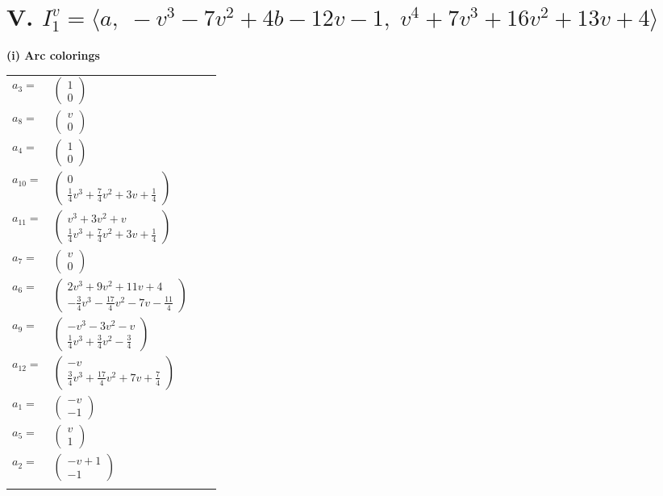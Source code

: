 \documentclass[1p]{elsarticle_modified}
\theoremstyle{definition}
\begin{document}
\centering \section*{V. $I^v_{1}= \langle a,\;- v^3-7 v^2+4 b-12 v-1,\;v^4+7 v^3+16 v^2+13 v+4 \rangle$}
\flushleft \textbf{(i) Arc colorings}\\
\begin{tabular}{m{7pt} m{180pt} m{7pt} m{180pt} }
\flushright $a_{3}=$&$\begin{pmatrix}1\\0\end{pmatrix}$ \\
\flushright $a_{8}=$&$\begin{pmatrix}v\\0\end{pmatrix}$ \\
\flushright $a_{4}=$&$\begin{pmatrix}1\\0\end{pmatrix}$ \\
\flushright $a_{10}=$&$\begin{pmatrix}0\\\frac{1}{4} v^3+\frac{7}{4} v^2+3 v+\frac{1}{4}\end{pmatrix}$ \\
\flushright $a_{11}=$&$\begin{pmatrix}v^3+3 v^2+v\\\frac{1}{4} v^3+\frac{7}{4} v^2+3 v+\frac{1}{4}\end{pmatrix}$ \\
\flushright $a_{7}=$&$\begin{pmatrix}v\\0\end{pmatrix}$ \\
\flushright $a_{6}=$&$\begin{pmatrix}2 v^3+9 v^2+11 v+4\\-\frac{3}{4} v^3-\frac{17}{4} v^2-7 v-\frac{11}{4}\end{pmatrix}$ \\
\flushright $a_{9}=$&$\begin{pmatrix}- v^3-3 v^2- v\\\frac{1}{4} v^3+\frac{3}{4} v^2-\frac{3}{4}\end{pmatrix}$ \\
\flushright $a_{12}=$&$\begin{pmatrix}- v\\\frac{3}{4} v^3+\frac{17}{4} v^2+7 v+\frac{7}{4}\end{pmatrix}$ \\
\flushright $a_{1}=$&$\begin{pmatrix}- v\\-1\end{pmatrix}$ \\
\flushright $a_{5}=$&$\begin{pmatrix}v\\1\end{pmatrix}$ \\
\flushright $a_{2}=$&$\begin{pmatrix}- v+1\\-1\end{pmatrix}$\\&\end{tabular}
\end{document}
